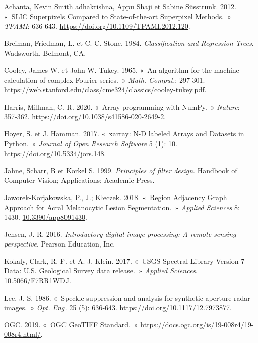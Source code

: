\documentclass[
  11pt,
  letterpaper,
  open=any,
  twoside=false,
  french]{scrbook}
\newlength{\cslhangindent}
\newenvironment{CSLReferences}[2] %
 {\begin{list}{}{%
  \setlength{\itemindent}{0pt}
  \setlength{\leftmargin}{0pt}
  \setlength{\parsep}{0pt}
  \ifodd #1
   \setlength{\leftmargin}{\cslhangindent}
   \setlength{\itemindent}{-1\cslhangindent}
  \fi
  \setlength{\itemsep}{#2\baselineskip}}}
 {\end{list}}
\begin{document}

\label{refs}
\begin{CSLReferences}{1}{0}
Achanta, Kevin Smith adhakrishna, Appu Shaji et Sabine Süsstrunk. 2012.
{«~SLIC Superpixels Compared to State-of-the-art Superpixel Methods.~»}
\emph{{TPAMI}}: 636‑643. \url{https://doi.org/10.1109/TPAMI.2012.120}.

Breiman, Friedman, L. et C. C. Stone. 1984. \emph{Classification and
Regression Trees}. {Wadsworth, Belmont, CA}.

Cooley, James W. et John W. Tukey. 1965. {«~An algorithm for the machine
calculation of complex Fourier series.~»} \emph{{Math. Comput.}}:
297‑301.
\url{https://web.stanford.edu/class/cme324/classics/cooley-tukey.pdf}.

Harris, Millman, C. R. 2020. {«~Array programming with NumPy.~»}
\emph{{Nature}}: 357‑362.
\url{https://doi.org/10.1038/s41586-020-2649-2}.

Hoyer, S. et J. Hamman. 2017. {«~xarray: N-D labeled Arrays and Datasets
in Python.~»} \emph{{Journal of Open Research Software}} 5 (1): 10.
\url{https://doi.org/10.5334/jors.148}.

Jahne, Scharr, B et Korkel S. 1999. \emph{Principles of filter design}.
Handbook of Computer Vision; Applications; Academic Press.

Jaworek-Korjakowska, P., J.; Kłeczek. 2018. {«~Region Adjacency Graph
Approach for Acral Melanocytic Lesion Segmentation.~»} \emph{{Applied
Sciences}} 8: 1430.
\href{https://10.3390/app8091430}{10.3390/app8091430}.

Jensen, J. R. 2016. \emph{Introductory digital image processing: A
remote sensing perspective}. {Pearson Education, Inc.}

Kokaly, Clark, R. F. et A. J. Klein. 2017. {«~USGS Spectral Library
Version 7 Data: U.S. Geological Survey data release.~»} \emph{{Applied
Sciences}}. \href{https://10.5066/F7RR1WDJ}{10.5066/F7RR1WDJ}.

Lee, J. S. 1986. {«~Speckle suppression and analysis for synthetic
aperture radar images.~»} \emph{{Opt. Eng.}} 25 (5): 636‑643.
\url{https://doi.org/10.1117/12.7973877}.

OGC. 2019. {«~{OGC GeoTIFF Standard}.~»}
\url{https://docs.ogc.org/is/19-008r4/19-008r4.html/}.

\end{CSLReferences}


\backmatter
\end{document}
